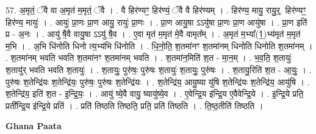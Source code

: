 \documentclass[17pt]{extarticle}
\begin{document}
57. अ॒मृतं॒ ॅवै वा अ॒मृत॑ म॒मृतं॒ ॅवै । . वै हिर॑ण्यꣳ॒॒ हिर॑ण्यं॒ ॅवै वै हिर॑ण्यम् । . हिर॑ण्य॒ मायु॒ रायु॒र्॒. हिर॑ण्यꣳ॒॒ हिर॑ण्य॒ मायुः॑ । . आयुः॑ प्रा॒णः प्रा॒ण आयु॒ रायुः॑ प्रा॒णः । . प्रा॒ण आयु॒षा ऽऽयु॑षा प्रा॒णः प्रा॒ण आयु॑षा । . प्रा॒ण इति॑ प्र - अ॒नः । . आयु॑ षै॒वै वायु॒षा ऽऽयु॑ षै॒व । . ए॒वा मृत॑ म॒मृत॑ मे॒वै वामृत᳚म् । . अ॒मृत॑ म॒भ्या᳚(1॒)भ्य॑मृत॑ म॒मृत॑ म॒भि । . अ॒भि धि॑नोति धिनो त्य॒भ्य॑भि धि॑नोति । . धि॒नो॒ति॒ श॒तमा॑नꣳ श॒तमा॑नम् धिनोति धिनोति श॒तमा॑नम् । . श॒तमा॑नम् भवति भवति श॒तमा॑नꣳ श॒तमा॑नम् भवति । . श॒तमा॑न॒मिति॑ श॒त - मा॒न॒म् । . भ॒व॒ति॒ श॒तायुः॑ श॒तायु॑र् भवति भवति श॒तायुः॑ । . श॒तायुः॒ पुरु॑षः॒ पुरु॑षः श॒तायुः॑ श॒तायुः॒ पुरु॑षः । . श॒तायु॒रिति॑ श॒त - आ॒युः॒ । . पुरु॑षः श॒तेन्द्रि॑यः श॒तेन्द्रि॑यः॒ पुरु॑षः॒ पुरु॑षः श॒तेन्द्रि॑यः । . श॒तेन्द्रि॑य॒ आयु॒ष्या यु॑षि श॒तेन्द्रि॑यः श॒तेन्द्रि॑य॒ आयु॑षि । . श॒तेन्द्रि॑य॒ इति॑ श॒त - इ॒न्द्रि॒यः॒ । . आयु॑ ष्ये॒वै वायु॒ ष्यायु॑ष्ये॒व । . ए॒वेन्द्रि॒य इ॑न्द्रि॒य ए॒वैवेन्द्रि॒ये । . इ॒न्द्रि॒ये प्रति॒ प्रती᳚न्द्रि॒य इ॑न्द्रि॒ये प्रति॑ । . प्रति॑ तिष्ठति तिष्ठति॒ प्रति॒ प्रति॑ तिष्ठति । . ति॒ष्ठ॒तीति॑ तिष्ठति । \newline

\textbf{Ghana Paata } \newline
\end{document}

